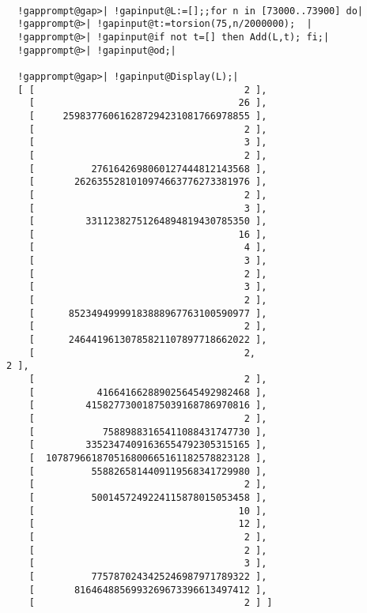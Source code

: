 \documentclass[a4paper,11pt]{report}
\begin{document}
{{\begin{Verbatim}[commandchars=!@|,fontsize=\small,frame=single,label=Example]
  
  !gapprompt@gap>| !gapinput@L:=[];;for n in [73000..73900] do|
  !gapprompt@>| !gapinput@t:=torsion(75,n/2000000);  |
  !gapprompt@>| !gapinput@if not t=[] then Add(L,t); fi;|
  !gapprompt@>| !gapinput@od;|
  
  !gapprompt@gap>| !gapinput@Display(L);|
  [ [                                     2 ],
    [                                    26 ],
    [     259837760616287294231081766978855 ],
    [                                     2 ],
    [                                     3 ],
    [                                     2 ],
    [          2761642698060127444812143568 ],
    [       2626355281010974663776273381976 ],
    [                                     2 ],
    [                                     3 ],
    [         33112382751264894819430785350 ],
    [                                    16 ],
    [                                     4 ],
    [                                     3 ],
    [                                     2 ],
    [                                     3 ],
    [                                     2 ],
    [      85234949999183888967763100590977 ],
    [                                     2 ],
    [      24644196130785821107897718662022 ],
    [                                     2,                                     2 ],
    [                                     2 ],
    [           416641662889025645492982468 ],
    [         41582773001875039168786970816 ],
    [                                     2 ],
    [            75889883165411088431747730 ],
    [         33523474091636554792305315165 ],
    [  107879661870516800665161182578823128 ],
    [          5588265814409119568341729980 ],
    [                                     2 ],
    [          5001457249224115878015053458 ],
    [                                    10 ],
    [                                    12 ],
    [                                     2 ],
    [                                     2 ],
    [                                     3 ],
    [          7757870243425246987971789322 ],
    [       8164648856993269673396613497412 ],
    [                                     2 ] ]
  
\end{Verbatim}
 }

 
}
\end{document}
